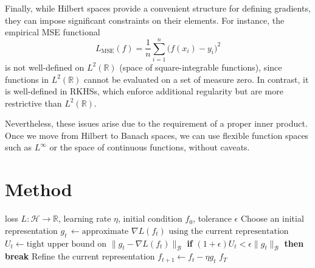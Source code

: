 \documentclass{article}
\newcommand{\R}{\mathbb{R}}
\renewcommand{\H}{\mathcal{H}}
\newcommand{\B}{\mathcal{B}}
\begin{document}
Finally, while Hilbert spaces provide a convenient structure for defining gradients, they can impose significant constraints on their elements.
For instance, the empirical MSE functional
\[ L_\mathrm{MSE}(f) = \frac{1}{n} \sum_{i=1}^n \bigl( f(x_i) - y_i \bigr)^2\]
is not well-defined on $L^2(\R)$ (space of square-integrable functions), since functions in $L^2(\R)$ cannot be evaluated on a set of measure zero.
In contrast, it is well-defined in RKHSs, which enforce additional regularity but are more restrictive than $L^2(\R)$.

Nevertheless, these issues arise due to the requirement of a proper inner product. Once we move from Hilbert to Banach spaces, we can use flexible function spaces such as $L^\infty$ or the space of continuous functions, without caveats.

\section{Method}

\begin{algorithm}[t]
    \caption{Functional gradient descent with adaptive representations}\label{alg:main-algorithm}
    \begin{algorithmic}
        \Require loss $L : \H \to \R$, learning rate $\eta$, initial condition $f_0$, tolerance $\epsilon$
        \State Choose an initial representation
        \vspace{0.1cm}
                \State $g_t \hspace{2pt}\gets \text{approximate $\nabla L(f_t)$ using the current representation}$
                \State $U_t \gets \text{tight upper bound on $\lVert g_t - \nabla L(f_t) \rVert_\B$}$
             \State \textbf{if} $(1+\epsilon) U_t < \epsilon \lVert g_t \rVert_\B$ \textbf{then break}
                \State Refine the current representation
            \EndWhile
            \vspace{0.2cm}
            \State $f_{t+1} \gets f_t - \eta g_t$
        \EndFor
        \State \Return $f_T$
    \end{algorithmic}
\end{algorithm}
\end{document}
